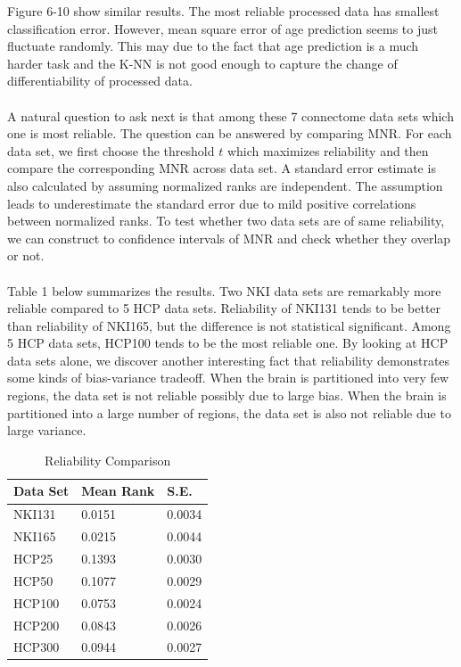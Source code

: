 \documentclass[11pt,journal,compsoc]{IEEEtran}
\begin{document}
\noindent Figure 6-10 show similar results. The most reliable processed data has smallest classification error. However, mean square error of age prediction seems to just fluctuate randomly. This may due to the fact that age prediction is a much harder task and the K-NN is not good enough to capture the change of differentiability of processed data.\\
\\
A natural question to ask next is that among these 7 connectome data sets which one is most reliable. The question can be answered by comparing MNR. For each data set, we first choose the threshold $t$ which maximizes reliability and then compare the corresponding MNR across data set. A standard error estimate is also calculated by assuming normalized ranks are independent. The assumption leads to underestimate the standard error due to mild positive correlations between normalized ranks. To test whether two data sets are of same reliability, we can construct to confidence intervals of MNR and check whether they overlap or not. \\
\\
Table 1 below summarizes the results. Two NKI data sets are remarkably more reliable compared to 5 HCP data sets. Reliability of NKI131 tends to be better than reliability of NKI165, but the difference is not statistical significant. Among 5 HCP data sets, HCP100 tends to be the most reliable one. By looking at HCP data sets alone, we discover another interesting fact that reliability demonstrates some kinds of bias-variance tradeoff. When the brain is partitioned into very few regions, the data set is not reliable possibly due to large bias. When the brain is partitioned into a large number of regions, the data set is also not reliable due to large variance. 

\begin{table}

\begin{center}
  \begin{tabular}{| p{2.5 cm} | p{2.5 cm} | p{2.5 cm} |}
    \hline
    Data Set & Mean Rank & S.E. \\ \hline
    NKI131 & 0.0151 & 0.0034 \\ \hline
    NKI165 & 0.0215 & 0.0044 \\ \hline
    HCP25 & 0.1393 & 0.0030 \\ \hline
    HCP50 & 0.1077 & 0.0029 \\ \hline
    HCP100 & 0.0753 & 0.0024 \\ \hline
    HCP200 & 0.0843 & 0.0026 \\ \hline
    HCP300 & 0.0944 & 0.0027 \\ \hline
  \end{tabular}
  \caption{Reliability Comparison}
\end{center}
\end{table}
\end{document}
